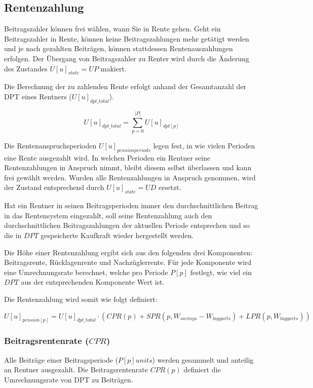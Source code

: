 \subsection{Rentenzahlung}

Beitragszahler können frei wählen, wann Sie in Rente gehen. Geht ein Beitragszahler in Rente, können keine Beitragszahlungen mehr getätigt werden und je nach gezahlten Beiträgen, können stattdessen Rentenauszahlungen erfolgen. Der Übergang von Beitragszahler zu Renter wird durch die Änderung des Zustandes $U[u]_{state} = UP$ makiert.

Die Berechnung der zu zahlenden Rente erfolgt anhand der Gesamtanzahl der DPT eines Rentners ($U[u]_{dpt\_total}$).

\begin{equation}
U[u]_{dpt\_total} = \sum_{p=0}^{|P|} U[u]_{dpt[p]}
\end{equation}

Die Rentenanspruchsperioden $U[u]_{pensionperiods}$ legen fest, in wie vielen Perioden eine Rente ausgezahlt wird. In
welchen Perioden ein Rentner seine Rentenzahlungen in Anspruch nimmt, bleibt diesem selbst überlassen und kann frei
gewählt werden. Wurden alle Rentenzahlungen in Anspruch genommen, wird der Zustand entsprechend durch $U[u]_{state} = UD$ ersetzt.

Hat ein
Rentner in seinen Beitragsperioden immer den durchschnittlichen Beitrag in das
Rentensystem eingezahlt, soll seine
Rentenzahlung auch den durchschnittlichen Beitragszahlungen der aktuellen
Periode entsprechen und so die in $DPT$ gespeicherte Kaufkraft wieder hergestellt werden.

Die Höhe einer Rentenzahlung ergibt sich aus den folgenden drei Komponenten: Beitragsrente, Rücklagenrente und Nachzüglerrente. Für jede Komponente wird eine Umrechnungsrate berechnet, welche pro 
Periode $P[p]$ festlegt, wie viel ein $DPT$ aus der entsprechenden
Komponente Wert ist.

Die Rentenzahlung wird somit wie folgt definiert:

\begin{dmath}
U[u]_{pension[p]} = U[u]_{dpt\_total} \cdot (CPR(p) + SPR(p, W_{savings} - W_{laggarts}) + LPR(p, W_{laggarts}))
\end{dmath}

\subsubsection*{Beitragsrentenrate ($CPR$)}
Alle Beiträge einer Beitragsperiode ($P[p]units$) werden gesammelt und anteilig an Rentner ausgezahlt. Die Beitragsrentenrate $CPR(p)$ definiert die Umrechnungsrate von DPT zu Beiträgen.

